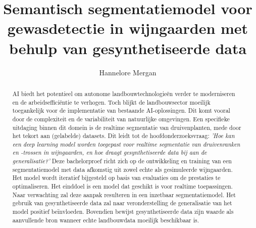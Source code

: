 \documentclass{hogent-article}
\title{Semantisch segmentatiemodel voor gewasdetectie in wijngaarden met behulp van gesynthetiseerde data}
\author{Hannelore Mergan}
\begin{document}
\begin{abstract}
AI biedt het potentieel om autonome landbouwtechnologieën verder te moderniseren en de arbeidsefficiëntie te verhogen. Toch blijkt de landbouwsector moeilijk toegankelijk voor de implementatie van bestaande AI-oplossingen. Dit komt vooral door de complexiteit en de variabiliteit van natuurlijke omgevingen. Een specifieke uitdaging binnen dit domein is de realtime segmentatie van druivenplanten, mede door het tekort aan (gelabelde) datasets. Dit leidt tot de hoofdonderzoeksvraag: \emph{'Hoe kan een deep learning model worden toegepast voor realtime segmentatie van druivenranken en -trossen in wijngaarden, en hoe draagt gesynthetiseerde data bij aan de generalisatie?'} Deze bachelorproef richt zich op de ontwikkeling en training van een segmentatiemodel met data afkomstig uit zowel echte als gesimuleerde wijngaarden. Het model wordt iteratief bijgesteld op basis van evaluaties om de prestaties te optimaliseren. Het einddoel is een model dat geschikt is voor realtime toepassingen. Naar verwachting zal deze aanpak resulteren in een inzetbaar segmentatiemodel. Het gebruik van gesynthetiseerde data zal naar veronderstelling de generalisatie van het model positief beïnvloeden. Bovendien bewijst gesynthetiseerde data zijn waarde als aanvullende bron wanneer echte landbouwdata moeilijk beschikbaar is.
\end{abstract}

\tableofcontents



\printbibliography[heading=bibintoc]
\end{document}
